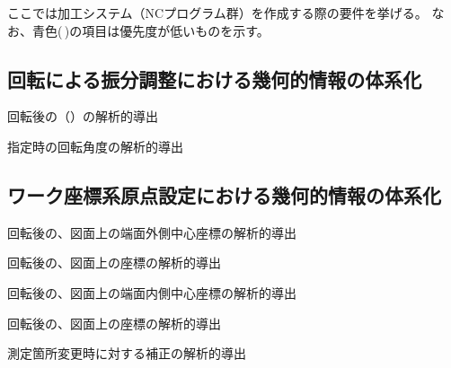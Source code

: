 

ここでは加工システム（NCプログラム群）を作成する際の要件を挙げる。
なお、青色(\,\sarrow\!)の項目は優先度が低いものを示す。




\subsection{\Table 回転による振分調整における幾何的情報の体系化}
\begin{enumerate}[label={\sarrow[red]}]
\item \Table 回転後の\AlocationLength（\ReAlocationLength）の解析的導出
\item \ReAlocationLength 指定時の\Table 回転角度の解析的導出
\end{enumerate}


\subsection{ワーク座標系原点設定における幾何的情報の体系化}
\begin{enumerate}[label={\sarrow[red]}]
\item \Table 回転後の、図面上の端面外側中心座標の解析的導出
\item \Table 回転後の、図面上の\OutcutCenter 座標の解析的導出
\item \Table 回転後の、図面上の端面内側中心座標の解析的導出
\item \Table 回転後の、図面上の\KeywayCenter 座標の解析的導出
\item 測定箇所変更時に対する補正の解析的導出
\end{enumerate}



